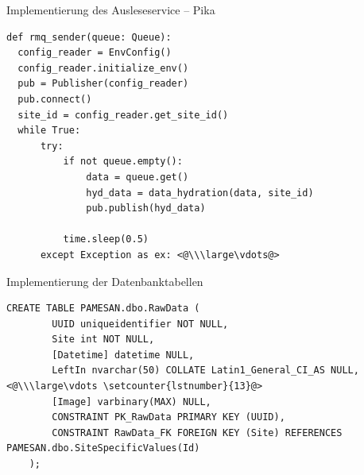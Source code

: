 \documentclass[10pt,ngerman]{beamer}
\begin{document}


\begin{frame}[fragile]{Implementierung des Ausleseservice -- Pika}
  \begin{lstlisting}[style=MyPythonStyle,
    breaklines=true, firstnumber=75]
def rmq_sender(queue: Queue):
  config_reader = EnvConfig()
  config_reader.initialize_env()
  pub = Publisher(config_reader)
  pub.connect()
  site_id = config_reader.get_site_id()
  while True:
      try:
          if not queue.empty():
              data = queue.get()
              hyd_data = data_hydration(data, site_id)
              pub.publish(hyd_data)

          time.sleep(0.5)
      except Exception as ex: <@\\\large\vdots@>
\end{lstlisting}
\end{frame}



\begin{frame}[fragile]{Implementierung der Datenbanktabellen}
  \begin{lstlisting}[style=sql-style,
    breaklines=true]
    CREATE TABLE PAMESAN.dbo.RawData (
        UUID uniqueidentifier NOT NULL,
        Site int NOT NULL,
        [Datetime] datetime NULL,
        LeftIn nvarchar(50) COLLATE Latin1_General_CI_AS NULL, <@\\\large\vdots \setcounter{lstnumber}{13}@>
        [Image] varbinary(MAX) NULL,
        CONSTRAINT PK_RawData PRIMARY KEY (UUID),
        CONSTRAINT RawData_FK FOREIGN KEY (Site) REFERENCES PAMESAN.dbo.SiteSpecificValues(Id)
    );
\end{lstlisting}
\end{frame}
\end{document}
